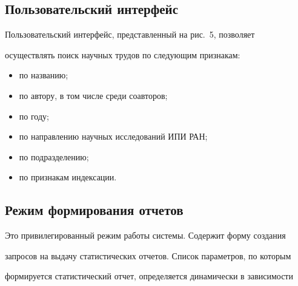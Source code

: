 \vspace*{-4pt}





\subsection{Пользовательский интерфейс}





\vspace*{-2pt}





  Пользовательский интерфейс, представленный на рис.~5, позволяет


осуществлять поиск научных трудов по следующим признакам:





\noindent


  \begin{itemize}


\item по названию;


\item по автору, в том числе среди соавторов;


\item по году;


\item по направлению научных исследований ИПИ РАН;


\item по подразделению;


\item по признакам индексации.


\end{itemize}





\subsection{Режим формирования отчетов}





  Это привилегированный режим работы системы. Содержит форму создания


запросов на выдачу статистических отчетов. Список параметров, по которым


формируется статистический отчет, определяется динамически в зависимости


